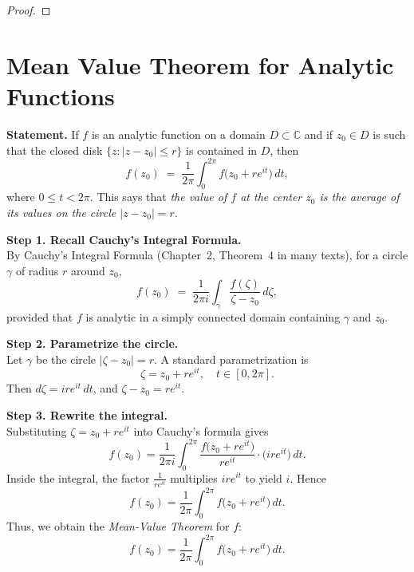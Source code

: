 \documentclass[12pt]{article}
\theoremstyle{definition} %
\theoremstyle{plain} %
\begin{document}
\begin{proof}
    \end{proof}
    \section*{Mean Value Theorem for Analytic Functions}

    \noindent
    \textbf{Statement.} 
    If $f$ is an analytic function on a domain $D \subset \mathbb{C}$ and if
    $z_0 \in D$ is such that the closed disk $\{ z : |z - z_0| \le r \}$ is contained in $D$, 
    then
    \[
      f(z_0)
      \;=\;
      \frac{1}{2\pi}
      \int_{0}^{2\pi}
          f\bigl(z_0 + r e^{i t}\bigr)\,dt,
    \]
    where $0 \le t < 2\pi$.  This says that \emph{the value of $f$ at the center $z_0$ is the
    average of its values on the circle $|z - z_0| = r$}.
    
    \bigskip
    
    \noindent
    \textbf{Step 1. Recall Cauchy's Integral Formula.}\\
    By Cauchy's Integral Formula (Chapter~2, Theorem~4 in many texts), for a circle $\gamma$ of radius $r$ around $z_0$,
    \[
      f(z_0)
      \;=\;
      \frac{1}{2\pi i}
      \int_{\gamma} \frac{f(\zeta)}{\zeta - z_0}\, d\zeta,
    \]
    provided that $f$ is analytic in a simply connected domain containing $\gamma$ and $z_0$.
    
    \medskip
    
    \noindent
    \textbf{Step 2. Parametrize the circle.}\\
    Let $\gamma$ be the circle $|\zeta - z_0| = r$.  A standard parametrization is
    \[
      \zeta = z_0 + r e^{i t},
      \quad t \in [0, 2\pi].
    \]
    Then $d\zeta = i r e^{i t} \,dt$, and $\zeta - z_0 = r e^{i t}$.
    
    \medskip
    
    \noindent
    \textbf{Step 3. Rewrite the integral.}\\
    Substituting $\zeta = z_0 + r e^{i t}$ into Cauchy's formula gives
    \[
      f(z_0)
      = \frac{1}{2\pi i}
        \int_{0}^{2\pi}
          \frac{f\bigl(z_0 + r e^{i t}\bigr)}{r e^{i t}}
          \cdot \bigl(i r e^{i t}\bigr)\, dt.
    \]
    Inside the integral, the factor $\frac{1}{r e^{i t}}$ multiplies $i r e^{i t}$ to yield $i$.  Hence
    \[
      f(z_0)
      = \frac{1}{2\pi}
        \int_{0}^{2\pi}
          f\bigl(z_0 + r e^{i t}\bigr)\, dt.
    \]
    Thus, we obtain the \emph{Mean‐Value Theorem} for $f$:
    \[
      f(z_0)
      = \frac{1}{2\pi}
        \int_{0}^{2\pi}
        f\bigl(z_0 + r e^{i t}\bigr)\, dt.
    \]
    
\end{document}

